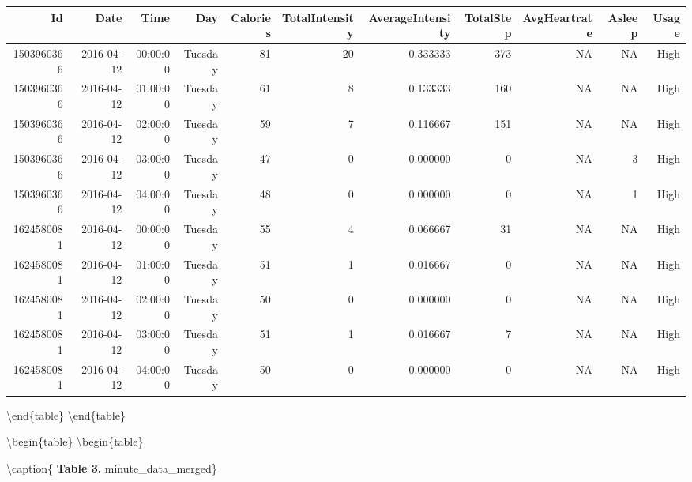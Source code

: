 \documentclass[
]{article}
\begin{document}
\begin{tabular}[t]{r|r|r|r|r|r|r|r|r|r|r}
\hline
Id & Date & Time & Day & Calories & TotalIntensity & AverageIntensity & TotalStep & AvgHeartrate & Asleep & Usage\\
\hline
1503960366 & 2016-04-12 & 00:00:00 & Tuesday & 81 & 20 & 0.333333 & 373 & NA & NA & High\\
\hline
1503960366 & 2016-04-12 & 01:00:00 & Tuesday & 61 & 8 & 0.133333 & 160 & NA & NA & High\\
\hline
1503960366 & 2016-04-12 & 02:00:00 & Tuesday & 59 & 7 & 0.116667 & 151 & NA & NA & High\\
\hline
1503960366 & 2016-04-12 & 03:00:00 & Tuesday & 47 & 0 & 0.000000 & 0 & NA & 3 & High\\
\hline
1503960366 & 2016-04-12 & 04:00:00 & Tuesday & 48 & 0 & 0.000000 & 0 & NA & 1 & High\\
\hline
1624580081 & 2016-04-12 & 00:00:00 & Tuesday & 55 & 4 & 0.066667 & 31 & NA & NA & High\\
\hline
1624580081 & 2016-04-12 & 01:00:00 & Tuesday & 51 & 1 & 0.016667 & 0 & NA & NA & High\\
\hline
1624580081 & 2016-04-12 & 02:00:00 & Tuesday & 50 & 0 & 0.000000 & 0 & NA & NA & High\\
\hline
1624580081 & 2016-04-12 & 03:00:00 & Tuesday & 51 & 1 & 0.016667 & 7 & NA & NA & High\\
\hline
1624580081 & 2016-04-12 & 04:00:00 & Tuesday & 50 & 0 & 0.000000 & 0 & NA & NA & High\\
\hline
\end{tabular}

\textbackslash end\{table\} \textbackslash end\{table\}

\textbackslash begin\{table\} \textbackslash begin\{table\}

\textbackslash caption\{\label{tab:unnamed-chunk-6} \textbf{Table 3.}
minute\_data\_merged\} \centering
\end{document}
